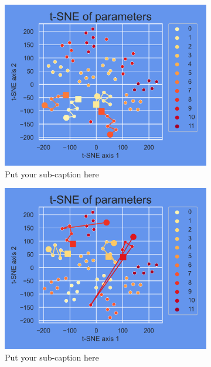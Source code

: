 \begin{figure}[ht]
	\centering
	\begin{subfigure}{.45\textwidth}
		\centering
		\includegraphics[width=.9\linewidth]{./figs/params_tSNE_0.png}  
		\caption{Put your sub-caption here}
		\label{fig:sub-first}
	\end{subfigure}
	\begin{subfigure}{.45\textwidth}
		\centering
		\includegraphics[width=.9\linewidth]{./figs/params_tSNE_1.png}  
		\caption{Put your sub-caption here}
		\label{fig:sub-second}
	\end{subfigure}
	\begin{subfigure}{.45\textwidth}
		\centering

\end{subfigure}
\end{figure}
